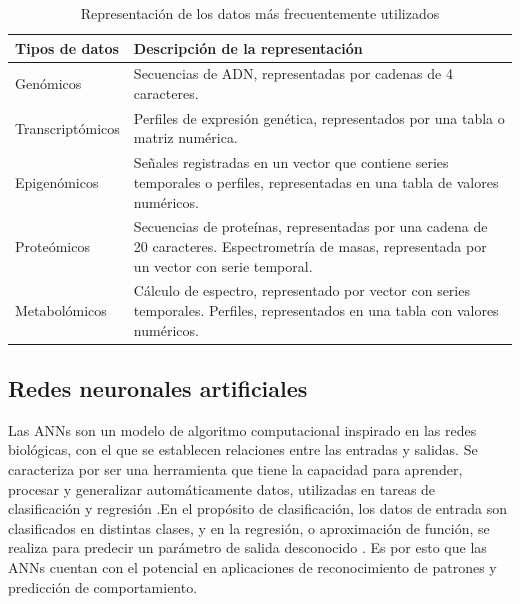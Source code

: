 \begin{table}[!h]
    \scriptsize
    \centering
    \caption{Representación de los datos más frecuentemente utilizados}
    
    \begin{tabular}{
    >{\centering\arraybackslash}m{4cm} 
    >{\centering\arraybackslash}m{9cm}}
\hline 
        \textbf{Tipos de datos} & 
        \textbf{Descripción de la representación} 
\\      
    \hline \hline 

    Genómicos &
    Secuencias de ADN, representadas por cadenas de 4 caracteres.
\\
    \hline
    Transcriptómicos &
    Perfiles de expresión genética, representados por una tabla o matriz numérica.
\\
    \hline
    Epigenómicos &
    Señales registradas en un vector que contiene series temporales o perfiles, representadas en una tabla de valores numéricos.
\\
    \hline
     Proteómicos &
     Secuencias de proteínas, representadas por una cadena de 20 caracteres. Espectrometría de masas, representada por un vector con serie temporal.
\\
     \hline
     Metabolómicos &
     Cálculo de espectro, representado por vector con series temporales.
     Perfiles, representados en una tabla con valores numéricos.
\\
    
\hline
    \end{tabular}
    \label{tab:Datos_cod}
\end{table}

\subsection{Redes neuronales artificiales}

 Las ANNs son un modelo de algoritmo computacional inspirado en las redes biológicas, con el que se establecen relaciones entre las entradas y salidas. Se caracteriza por ser una herramienta que tiene la capacidad para aprender, procesar y generalizar automáticamente datos, utilizadas en tareas de clasificación y regresión \citep{NeuronalNet2014}.En el propósito de clasificación, los datos de entrada son clasificados en distintas clases, y en la regresión, o aproximación de función, se realiza para predecir un parámetro de salida desconocido \citep{NeuronalNet2014}. Es por esto que las ANNs cuentan con el potencial en aplicaciones de reconocimiento de patrones y predicción de comportamiento.

